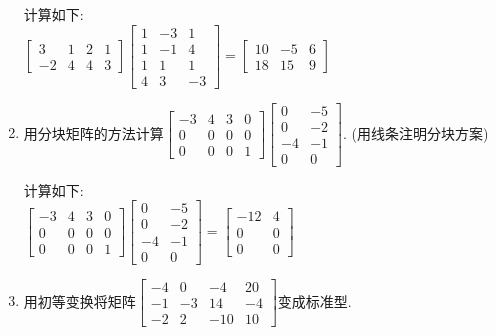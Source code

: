 \documentclass[12pt,a4paper]{ctexart}%
\begin{document}
\begin{enumerate}[1)]
\begin{solve}%
计算如下:\\
$\begin{bmatrix}
3 & 1 & 2 & 1\\
-2 & 4 & 4 & 3
\end{bmatrix}\begin{bmatrix}
1 & -3 & 1\\
1 & -1 & 4\\
1 & 1 & 1\\
4 & 3 & -3
\end{bmatrix}=\begin{bmatrix}
10 & -5 & 6\\
18 & 15 & 9
\end{bmatrix}$%
\end{solve}%
\item%
用分块矩阵的方法计算$\begin{bmatrix}
-3 & 4 & 3 & 0\\
0 & 0 & 0 & 0\\
0 & 0 & 0 & 1
\end{bmatrix}\begin{bmatrix}
0 & -5\\
0 & -2\\
-4 & -1\\
0 & 0
\end{bmatrix}$. (用线条注明分块方案)

\begin{solve}%
计算如下:\\
$\begin{bmatrix}
-3 & 4 & 3 & 0\\
0 & 0 & 0 & 0\\
0 & 0 & 0 & 1
\end{bmatrix}\begin{bmatrix}
0 & -5\\
0 & -2\\
-4 & -1\\
0 & 0
\end{bmatrix}=\begin{bmatrix}
-12 & 4\\
0 & 0\\
0 & 0
\end{bmatrix}$%
\end{solve}%
\item%
用初等变换将矩阵$\begin{bmatrix}
-4 & 0 & -4 & 20\\
-1 & -3 & 14 & -4\\
-2 & 2 & -10 & 10
\end{bmatrix}$变成标准型.


\end{enumerate}
\end{document}

